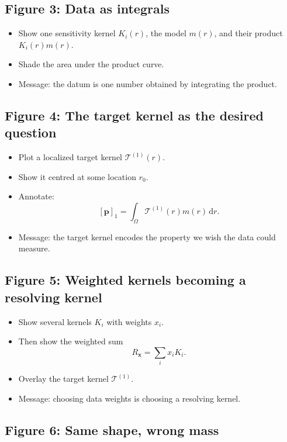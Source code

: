 \documentclass[11pt,openany]{book}
\theoremstyle{definition}
\theoremstyle{remark}
\newcommand{\dd}{\,\mathrm d}
\begin{document}
\subsection*{Figure 3: Data as integrals}

\begin{itemize}[leftmargin=*]
  \item Show one sensitivity kernel \(K_i(r)\), the model \(m(r)\), and their product
  \(K_i(r)m(r)\).
  \item Shade the area under the product curve.
  \item Message: the datum is one number obtained by integrating the product.
\end{itemize}

\subsection*{Figure 4: The target kernel as the desired question}

\begin{itemize}[leftmargin=*]
  \item Plot a localized target kernel \(\mathcal T^{(1)}(r)\).
  \item Show it centred at some location \(r_0\).
  \item Annotate:
  \[
    [\mathbf p]_1=\int_\Omega \mathcal T^{(1)}(r)m(r)\dd r.
  \]
  \item Message: the target kernel encodes the property we wish the data could measure.
\end{itemize}

\subsection*{Figure 5: Weighted kernels becoming a resolving kernel}

\begin{itemize}[leftmargin=*]
  \item Show several kernels \(K_i\) with weights \(x_i\).
  \item Then show the weighted sum
  \[
    R_{\mathbf x}=\sum_i x_iK_i.
  \]
  \item Overlay the target kernel \(\mathcal T^{(1)}\).
  \item Message: choosing data weights is choosing a resolving kernel.
\end{itemize}

\subsection*{Figure 6: Same shape, wrong mass}
\end{document}
